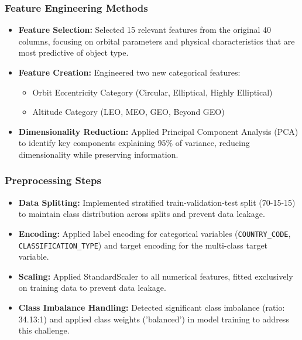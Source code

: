 \documentclass[12pt,a4paper]{article}
\begin{document}
\subsubsection{Feature Engineering Methods}
\begin{itemize}
    \item \textbf{Feature Selection:} Selected 15 relevant features from the original 40 columns, focusing on orbital parameters and physical characteristics that are most predictive of object type.
    \item \textbf{Feature Creation:} Engineered two new categorical features:
    \begin{itemize}
        \item Orbit Eccentricity Category (Circular, Elliptical, Highly Elliptical)
        \item Altitude Category (LEO, MEO, GEO, Beyond GEO)
    \end{itemize}
    \item \textbf{Dimensionality Reduction:} Applied Principal Component Analysis (PCA) to identify key components explaining 95\% of variance, reducing dimensionality while preserving information.
\end{itemize}

\subsubsection{Preprocessing Steps}
\begin{itemize}
    \item \textbf{Data Splitting:} Implemented stratified train-validation-test split (70-15-15) to maintain class distribution across splits and prevent data leakage.
    \item \textbf{Encoding:} Applied label encoding for categorical variables (\texttt{COUNTRY\_CODE}, \texttt{CLASSIFICATION\_TYPE}) and target encoding for the multi-class target variable.
    \item \textbf{Scaling:} Applied StandardScaler to all numerical features, fitted exclusively on training data to prevent data leakage.
    \item \textbf{Class Imbalance Handling:} Detected significant class imbalance (ratio: 34.13:1) and applied class weights ('balanced') in model training to address this challenge.
\end{itemize}
\end{document}
